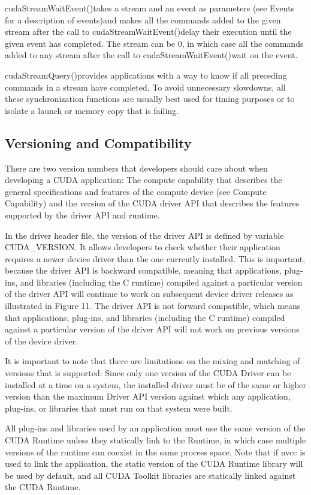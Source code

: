 cudaStreamWaitEvent()takes a stream and an event as parameters (see Events
for a description of events)and makes all the commands added to the given
stream after the call to cudaStreamWaitEvent()delay their execution until the
given event has completed. The stream can be 0, in which case all the commands
added to any stream after the call to cudaStreamWaitEvent()wait on the event.

cudaStreamQuery()provides applications with a way to know if all preceding
commands in a stream have completed. To avoid unnecessary slowdowns, all these
synchronization functions are usually best used for timing purposes or to
isolate a launch or memory copy that is failing.
%
\subsection{Versioning and Compatibility}%
There are two version numbers that developers should care about when developing
a CUDA application: The compute capability that describes the general
specifications and features of the compute device (see Compute Capability) and
the version of the CUDA driver API that describes the features supported by the
driver API and runtime.

In the driver header file, the version of the driver API is defined by variable CUDA\_VERSION. It allows developers to check whether their application requires a newer device driver than the one currently installed. This is important, because the driver API is backward compatible, meaning that applications, plug-ins, and libraries (including the C runtime) compiled against a particular version of the driver API will continue to work on subsequent device driver releases as illustrated in Figure 11. The driver API is not forward compatible, which means that applications, plug-ins, and libraries (including the C runtime) compiled against a particular version of the driver API will not work on previous versions of the device driver.

It is important to note that there are limitations on the mixing and matching of versions that is supported: Since only one version of the CUDA Driver can be installed at a time on a system, the installed driver must be of the same or higher version than the maximum Driver API version against which any application, plug-ins, or libraries that must run on that system were built.

All plug-ins and libraries used by an application must use the same version of
the CUDA Runtime unless they statically link to the Runtime, in which case
multiple versions of the runtime can coexist in the same process space. Note
that if nvcc is used to link the application, the static version of the CUDA
Runtime library will be used by default, and all CUDA Toolkit libraries are
statically linked against the CUDA Runtime.

